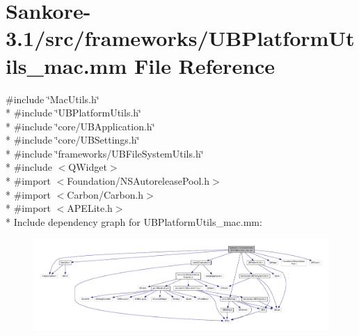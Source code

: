 \hypertarget{_u_b_platform_utils__mac_8mm}{\section{Sankore-\/3.1/src/frameworks/\-U\-B\-Platform\-Utils\-\_\-mac.mm File Reference}
\label{d7/d72/_u_b_platform_utils__mac_8mm}
}
{\ttfamily \#include \char`\"{}Mac\-Utils.\-h\char`\"{}}\\*
{\ttfamily \#include \char`\"{}U\-B\-Platform\-Utils.\-h\char`\"{}}\\*
{\ttfamily \#include \char`\"{}core/\-U\-B\-Application.\-h\char`\"{}}\\*
{\ttfamily \#include \char`\"{}core/\-U\-B\-Settings.\-h\char`\"{}}\\*
{\ttfamily \#include \char`\"{}frameworks/\-U\-B\-File\-System\-Utils.\-h\char`\"{}}\\*
{\ttfamily \#include $<$Q\-Widget$>$}\\*
{\ttfamily \#import $<$Foundation/\-N\-S\-Autorelease\-Pool.\-h$>$}\\*
{\ttfamily \#import $<$Carbon/\-Carbon.\-h$>$}\\*
{\ttfamily \#import $<$A\-P\-E\-Lite.\-h$>$}\\*
Include dependency graph for U\-B\-Platform\-Utils\-\_\-mac.\-mm\-:
\nopagebreak
\begin{figure}[H]
\begin{center}
\leavevmode
\includegraphics[width=350pt]{db/d43/_u_b_platform_utils__mac_8mm__incl}
\end{center}
\end{figure}
